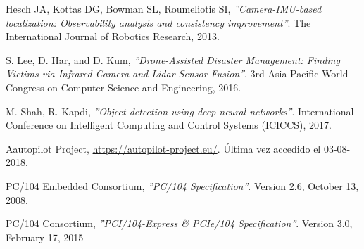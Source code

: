 \begin{thebibliography}{9}
    Hesch JA, Kottas DG, Bowman SL, Roumeliotis SI,
    \textit{''Camera-IMU-based localization: Observability analysis and consistency improvement''}.
    The International Journal of Robotics Research,
    2013.

    S. Lee, D. Har, and D. Kum,
    \textit{''Drone-Assisted Disaster Management: Finding Victims via Infrared Camera and Lidar Sensor Fusion''}.
    3rd Asia-Pacific World Congress on Computer Science and Engineering, 
    2016.

    M. Shah, R. Kapdi,
    \textit{''Object detection using deep neural networks''}.
     International Conference on Intelligent Computing and Control Systems (ICICCS),
     2017.
     
    Aautopilot Project,
    \url{https://autopilot-project.eu/}.
    Última vez accedido el 03-08-2018.

    PC/104 Embedded Consortium,
    \textit{''PC/104 Specification''}.
    Version 2.6,
    October 13, 2008.

    PC/104 Consortium,
    \textit{''PCI/104-Express \& PCIe/104 Specification''}.
    Version 3.0,
    February 17, 2015
    
\end{thebibliography}
